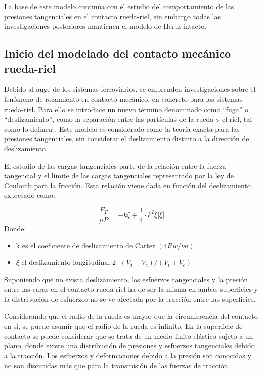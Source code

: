 \documentclass[main]{subfiles}
\begin{document}
La base de este modelo continúa con el estudio del comportamiento de las presiones tangenciales en el contacto rueda-riel, sin embargo todas las investigaciones posteriores mantienen el modelo de Hertz intacto.

\subsection{Inicio del modelado del contacto mecánico rueda-riel}
 
Debido al auge de los sistemas ferroviarios, se emprenden investigaciones sobre el fenómeno de rozamiento en contacto mecánico, en concreto para los sistemas rueda-riel. Para ello se introduce un nuevo término denominado como “fuga” o “deslizamiento”, como la separación entre las partículas de la rueda y el riel, tal como lo definen \citet{Carter1926}. Este modelo es considerado como la teoría exacta para las presiones tangenciales, sin considerar el deslizamiento distinto a la dirección de deslizamiento.

El estudio de las cargas tangenciales parte de la relación entre la fuerza tangencial y el límite de las cargas tangenciales representado por la ley de Coulomb para la fricción. Esta relación viene dada en función del deslizamiento expresado como:

  \begin{equation}
  \label{eq:Eq10}
  \frac{F_T}{\mu P}=-k\xi+\frac{1}{4}\cdot k^2 \xi \left|\xi \right|
  \end{equation}
  Donde:
  
  \begin{itemize}
  \item k es el coeficiente de deslizamiento de Carter $(4Rw/\nu a)$
  \item $\xi$ el deslizamiento longitudinal 
$2 \cdot (V_t-V_c)/(V_t+V_c)$
  \end{itemize}
 
 Suponiendo que no exista deslizamiento, los esfuerzos tangenciales y la presión entre las caras en el contacto rueda-riel ha de ser la misma en ambas superficies y la distribución de esfuerzos no se ve afectada por la tracción entre las superficies.
 
Considerando que el radio de la rueda es mayor que la circunferencia del contacto en sí, se puede asumir que el radio de la rueda es infinito. En la superficie de contacto se puede considerar que se trata de un medio finito elástico sujeto a un plano, donde existe una distribución de presiones y esfuerzos tangenciales debido a la tracción. Los esfuerzos y deformaciones debido a la presión son conocidas y no son discutidas más que para la transmisión de las fuerzas de tracción.
 
\end{document}
